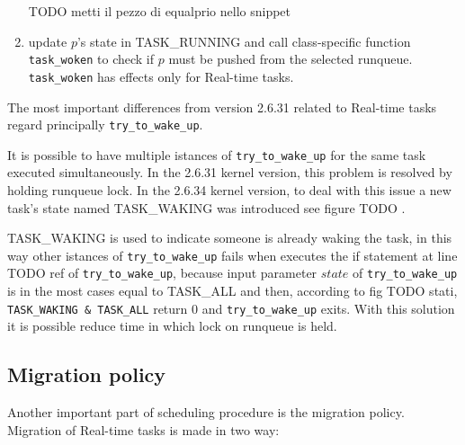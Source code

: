 \begin{enumerate}
TODO metti il pezzo di equalprio nello snippet
\lstset{basicstyle=\footnotesize, language=c, captionpos=b, frame=single,label=lis:steps}


\item update $p$'s state in TASK\_RUNNING and call class-specific function 
\texttt{task\_woken} to check if $p$ must be pushed from the selected runqueue.
\texttt{task\_woken} has effects only for Real-time tasks.

\lstset{basicstyle=\footnotesize, language=c, captionpos=b, frame=single,label=lis:steps}


\end{enumerate}

The most important differences from version 2.6.31 related to Real-time tasks regard principally \texttt{try\_to\_wake\_up}.

It is possible to have multiple istances of \texttt{try\_to\_wake\_up} for the same task executed simultaneously. In the 2.6.31 kernel version, this problem
is resolved by holding runqueue lock. In the 2.6.34 kernel version, to deal with this issue a new task's state named TASK\_WAKING was introduced see 
figure TODO . 

\lstset{basicstyle=\footnotesize, language=c, captionpos=b, frame=single,label=lis:steps}


TASK\_WAKING is used to indicate someone is already waking the task, in this way other istances of \texttt{try\_to\_wake\_up} fails when executes the if 
statement at line TODO ref of \texttt{try\_to\_wake\_up}, because input parameter $state$ of \texttt{try\_to\_wake\_up} is in the most cases equal to 
TASK\_ALL and then, according to fig TODO stati, \texttt{TASK\_WAKING \& TASK\_ALL} return 0 and \texttt{try\_to\_wake\_up} exits. With this solution 
it is possible reduce time in which lock on runqueue is held. 


\subsection{Migration policy}

Another important part of scheduling procedure is the migration policy. Migration of Real-time tasks is made in two way: 

